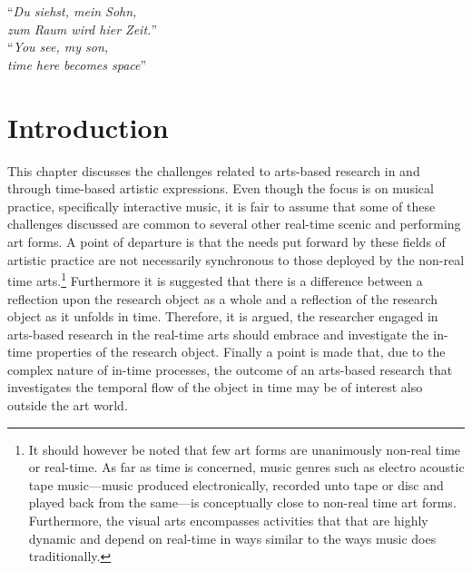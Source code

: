 \section*{}

\begin{minipage}[t]{.48\textwidth}
  \vspace{0pt}

\end{minipage}
\hfill
\begin{minipage}[t]{.48\textwidth}
  \begin{flushright}
    ``\emph{Du siehst, mein Sohn,\\
      zum Raum wird hier Zeit.}''\\
    \vspace{0.5cm}
    ``\emph{You see, my son,\\
      time here becomes space}''
  \end{flushright}
\end{minipage}
\vspace{1cm}


\section{Introduction}
\label{sec:introduction}

\noindent
This chapter discusses the challenges related to arts-based research in and through time-based artistic expressions. Even though the focus is on musical practice, specifically interactive music, it is fair to assume that some of these challenges discussed are common to several other real-time scenic and performing art forms. A point of departure is that the needs put forward by these fields of artistic practice are not necessarily synchronous to those deployed by the non-real time arts.\footnote{It should however be noted that few art forms are unanimously non-real time or real-time. As far as time is concerned, music genres such as electro acoustic tape music---music produced electronically, recorded unto tape or disc and played back from the same---is conceptually close to non-real time art forms. Furthermore, the visual arts encompasses activities that that are highly dynamic and depend on real-time in ways similar to the ways music does traditionally.} Furthermore it is suggested that there is a difference between a reflection upon the research object as a whole and a reflection of the research object as it unfolds in time. Therefore, it is argued, the researcher engaged in arts-based research in the real-time arts should embrace and investigate the in-time properties of the research object. Finally a point is made that, due to the complex nature of in-time processes, the outcome of an arts-based research that investigates the temporal flow of the object in time may be of interest also outside the art world. 

